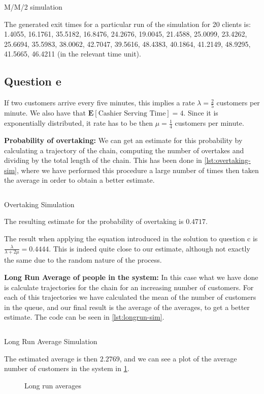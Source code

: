 \documentclass[11pt, a4paper]{article}
\begin{document}
\begin{listing}[H]
	\inputminted[firstline = 143, lastline = 166]{R}{../main.R}
	\caption{M/M/2 simulation}
	\label{lst:mm2sim}
\end{listing}
The generated exit times for a particular run of the simulation for 20 clients is:  1.4055, 16.1761, 35.5182, 16.8476, 24.2676, 19.0045, 21.4588, 25.0099, 23.4262, 25.6694, 35.5983, 38.0062, 42.7047,
39.5616, 48.4383, 40.1864, 41.2149, 48.9295, 41.5665, 46.4211 (in the relevant time unit).

\subsection*{Question e}
If two customers arrive every five minutes, this implies a rate $\lambda = \frac{2}{5}$ customers per minute. We also have that $\mathbf{E}\left[ \text{Cashier Serving Time}\right] = 4$. Since it is exponentially distributed, it rate has to be then $\mu = \frac{1}{4}$ customers per minute.


\textbf{Probability of overtaking:} We can get an estimate for this probability by calculating a trajectory of the chain, computing the number of overtakes and dividing by the total length of the chain. This has been done in \cref{lst:overtaking-sim}, where we have performed this procedure a large number of times then taken the average in order to obtain a better estimate.
\begin{listing}[H]
	\inputminted[firstline = 175, lastline = 187]{R}{../main.R}
	\caption{Overtaking Simulation}
	\label{lst:overtaking-sim}
\end{listing}
The resulting estimate for the probability of overtaking is $0.4717$.

The result when applying the equation introduced in the solution to question c is $\frac{\lambda}{\lambda + 2\mu} = 0.4444$. This is indeed quite close to our estimate, although not exactly the same due to the random nature of the process.

\textbf{Long Run Average of people in the system:}
In this case what we have done is calculate trajectories for the chain for an increasing number of customers. For each of this trajectories we have calculated the mean of the number of customers in the queue, and our final result is the average of the averages, to get a better estimate. The code can be seen in \cref{lst:longrun-sim}.
\begin{listing}[H]
	\inputminted[firstline = 198, lastline = 203]{R}{../main.R}
	\caption{Long Run Average Simulation}
	\label{lst:longrun-sim}
\end{listing}
The estimated average is then $2.2769$, and we can see a plot of the average number of customers in the system in \cref{fig:lravg}.
\begin{figure}[H]
	\centering
	
	\caption{Long run averages}
	\label{fig:lravg}
\end{figure}
\end{document}
